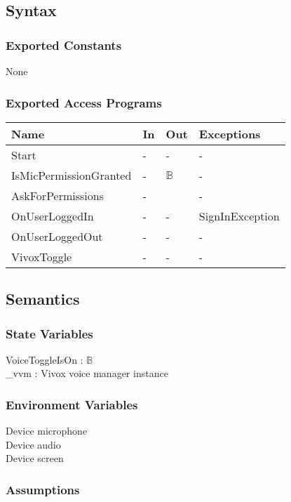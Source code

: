 \documentclass[12pt, titlepage]{article}
\begin{document}
\subsection{Syntax}

\subsubsection{Exported Constants}
None

\subsubsection{Exported Access Programs}

\begin{center}
\begin{tabular}{p{5cm} p{4cm} p{4cm} p{2cm}}
\hline
\textbf{Name} & \textbf{In} & \textbf{Out} & \textbf{Exceptions} \\
\hline
Start & - & - & - \\
IsMicPermissionGranted  & - & $\mathds{B}$ & - \\
AskForPermissions  & - &  & - \\
OnUserLoggedIn  & - & - & SignInException \\
OnUserLoggedOut  & - & - & - \\
VivoxToggle  & - & - & - \\
\hline
\end{tabular}
\end{center}

\subsection{Semantics}

\subsubsection{State Variables}

VoiceToggleIsOn : $\mathds{B}$\\
\_vvm : Vivox voice manager instance

\subsubsection{Environment Variables}

Device microphone\\
Device audio\\
Device screen

\subsubsection{Assumptions}
\end{document}
